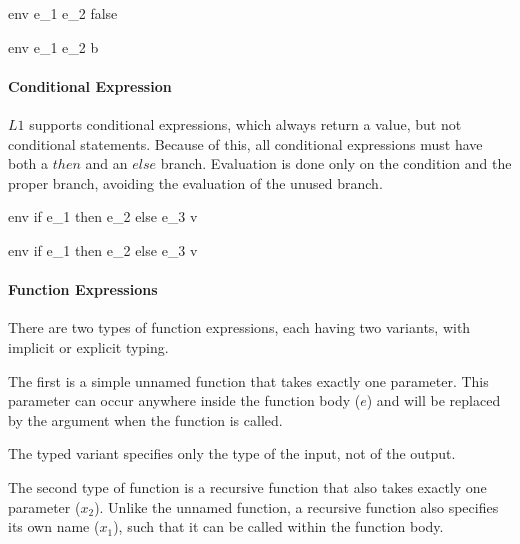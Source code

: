 \documentclass{article}
\begin{document}
    {\mbox{env} \vdash e_1 \wedge e_2 \Downarrow false}
    
    {\mbox{env} \vdash e_1 \wedge e_2 \Downarrow b}
    
\paragraph{Conditional Expression}
$L1$ supports conditional expressions, which always return a value, but not conditional statements.
Because of this, all conditional expressions must have both a $then$ and an $else$ branch.
Evaluation is done only on the condition and the proper branch, avoiding the evaluation of the unused branch.
    
    {\mbox{env} \vdash if \; e_1\; then \; e_2 \; else \; e_3 \Downarrow v}
    
    {\mbox{env} \vdash if \; e_1\; then \; e_2 \; else \; e_3 \Downarrow v}
    
\paragraph{Function Expressions}

There are two types of function expressions, each having two variants, with implicit or explicit typing.

\smallskip

The first is a simple unnamed function that takes exactly one parameter.
This parameter can occur anywhere inside the function body ($e$) and will be replaced by the argument when the function is called.

The typed variant specifies only the type of the input, not of the output.


    
The second type of function is a recursive function that also takes exactly one parameter ($x_2$).
Unlike the unnamed function, a recursive function also specifies its own name ($x_1$), such that it can be called within the function body.
\end{document}

